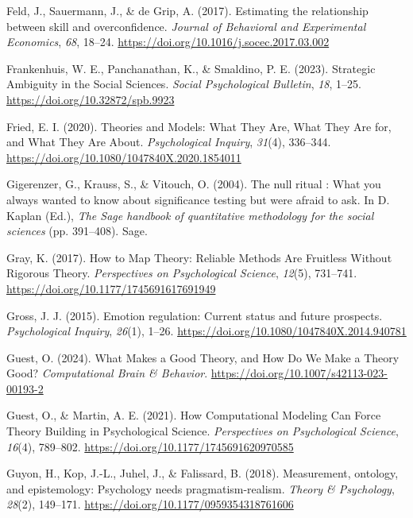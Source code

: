 \documentclass[
  man, noextraspace,floatsintext]{apa7}
\newlength{\cslhangindent}
\newenvironment{CSLReferences}[2] %
 {\begin{list}{}{%
  \setlength{\itemindent}{0pt}
  \setlength{\leftmargin}{0pt}
  \setlength{\parsep}{0pt}
  \ifodd #1
   \setlength{\leftmargin}{\cslhangindent}
   \setlength{\itemindent}{-1\cslhangindent}
  \fi
  \setlength{\itemsep}{#2\baselineskip}}}
 {\end{list}}
\begin{document}
\begin{CSLReferences}{1}{0}
Feld, J., Sauermann, J., \& de Grip, A. (2017). Estimating the relationship between skill and overconfidence. \emph{Journal of Behavioral and Experimental Economics}, \emph{68}, 18--24. \url{https://doi.org/10.1016/j.socec.2017.03.002}

Frankenhuis, W. E., Panchanathan, K., \& Smaldino, P. E. (2023). Strategic {Ambiguity} in the {Social Sciences}. \emph{Social Psychological Bulletin}, \emph{18}, 1--25. \url{https://doi.org/10.32872/spb.9923}

Fried, E. I. (2020). Theories and {Models}: {What They Are}, {What They Are} for, and {What They Are About}. \emph{Psychological Inquiry}, \emph{31}(4), 336--344. \url{https://doi.org/10.1080/1047840X.2020.1854011}

Gigerenzer, G., Krauss, S., \& Vitouch, O. (2004). The null ritual : {What} you always wanted to know about significance testing but were afraid to ask. In D. Kaplan (Ed.), \emph{The {Sage} handbook of quantitative methodology for the social sciences} (pp. 391--408). Sage.

Gray, K. (2017). How to {Map Theory}: {Reliable Methods Are Fruitless Without Rigorous Theory}. \emph{Perspectives on Psychological Science}, \emph{12}(5), 731--741. \url{https://doi.org/10.1177/1745691617691949}

Gross, J. J. (2015). Emotion regulation: {Current} status and future prospects. \emph{Psychological Inquiry}, \emph{26}(1), 1--26. \url{https://doi.org/10.1080/1047840X.2014.940781}

Guest, O. (2024). What {Makes} a {Good Theory}, and {How Do We Make} a {Theory Good}? \emph{Computational Brain \& Behavior}. \url{https://doi.org/10.1007/s42113-023-00193-2}

Guest, O., \& Martin, A. E. (2021). How {Computational Modeling Can Force Theory Building} in {Psychological Science}. \emph{Perspectives on Psychological Science}, \emph{16}(4), 789--802. \url{https://doi.org/10.1177/1745691620970585}

Guyon, H., Kop, J.-L., Juhel, J., \& Falissard, B. (2018). Measurement, ontology, and epistemology: {Psychology} needs pragmatism-realism. \emph{Theory \& Psychology}, \emph{28}(2), 149--171. \url{https://doi.org/10.1177/0959354318761606}


\end{CSLReferences}
\end{document}
